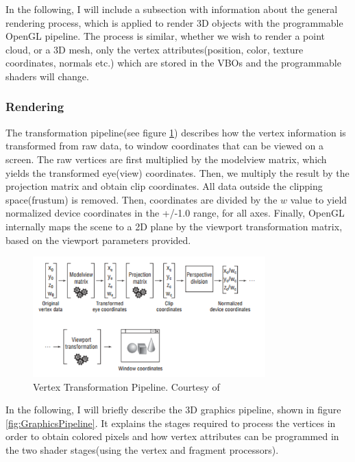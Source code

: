 \documentclass[]{article}
\begin{document}
In the following, I will include a subsection with information about the general rendering process, which is applied to render 3D objects with the programmable OpenGL pipeline. The process is similar, whether we wish to render a point cloud, or a 3D mesh, only the vertex attributes(position, color, texture coordinates, normals etc.) which are stored in the VBOs and the programmable shaders will change.

\subsubsection{Rendering}

The transformation pipeline(see figure \ref{fig:TransformationPipeline}) describes how the vertex information is transformed from raw data, to window coordinates that can be viewed on a screen. The raw vertices are first multiplied by the modelview matrix, which yields the transformed eye(view) coordinates. Then, we multiply the result by the projection matrix and obtain clip coordinates. All data outside the clipping space(frustum) is removed. Then, coordinates are divided by the $w$ value to yield normalized device coordinates  in the +/-1.0 range, for all axes. Finally, OpenGL internally maps the scene to a 2D plane by the viewport transformation matrix, based on the viewport parameters provided.

\begin{figure}[hbtp]
    \centering
    \includegraphics[width=0.8\textwidth]{figures/TransformationPipeline.PNG}
    \caption{Vertex Transformation Pipeline. Courtesy of \cite{superbible}}
    \label{fig:TransformationPipeline}
\end{figure}


In the following, I will briefly describe the 3D graphics pipeline, shown in figure \ref{fig:GraphicsPipeline}. It explains the stages required to process the vertices in order to obtain colored pixels and how vertex attributes can be programmed in the two shader stages(using the vertex and fragment processors).
\end{document}
